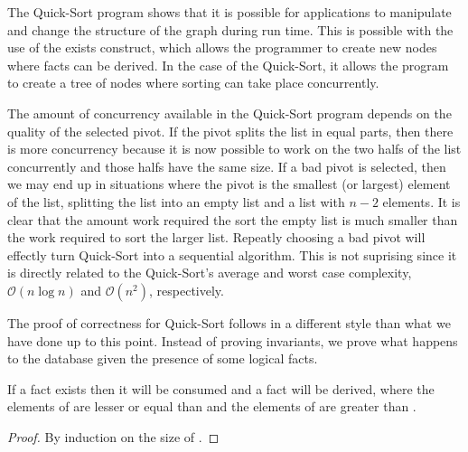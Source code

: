 The Quick-Sort program shows that it is possible for applications to manipulate
and change the structure of the graph during run time. This is possible with the
use of the exists construct, which allows the programmer to create new nodes
where facts can be derived. In the case of the Quick-Sort, it allows the program
to create a tree of nodes where sorting can take place concurrently.

The amount of concurrency available in the Quick-Sort program depends on the
quality of the selected pivot. If the pivot splits the list in equal parts, then
there is more concurrency because it is now possible to work on the two halfs of
the list concurrently and those halfs have the same size. If a bad pivot is
selected, then we may end up in situations where the pivot is the smallest (or
largest) element of the list, splitting the list into an empty list and a list
with $n-2$ elements. It is clear that the amount work required the sort the
empty list is much smaller than the work required to sort the larger list.
Repeatly choosing a bad pivot will effectly turn Quick-Sort into a sequential
algorithm. This is not suprising since it is directly related to the
Quick-Sort's average and worst case complexity, $\mathcal{O}(n \log{n})$ and
$\mathcal{O}(n^2)$, respectively.

The proof of correctness for Quick-Sort follows in a different style than what
we have done up to this point. Instead of proving invariants, we prove what
happens to the database given the presence of some logical facts.

\begin{lemma}

If a  fact exists then it will be
consumed and a  fact
will be derived, where the elements of  are lesser or equal than  and
the elements of  are greater than .

\end{lemma}
\begin{proof}
By induction on the size of .
\end{proof}

